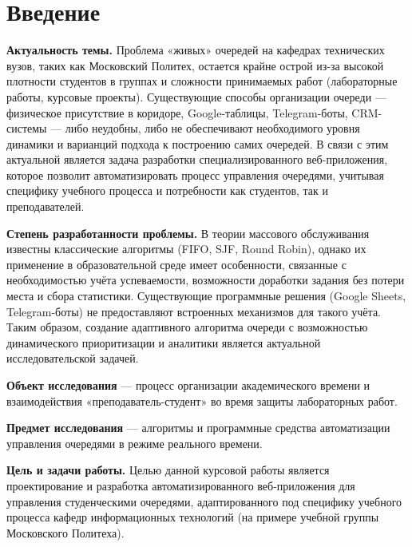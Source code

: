 \section*{Введение}

\textbf{Актуальность темы.} Проблема «живых» очередей на кафедрах технических вузов, 
таких как Московский Политех, остается крайне острой из-за высокой плотности студентов в группах
и сложности принимаемых работ (лабораторные работы, курсовые проекты). Существующие 
способы организации очереди — физическое присутствие в коридоре, Google-таблицы, 
Telegram-боты, CRM-системы — либо неудобны, либо не обеспечивают необходимого уровня динамики и варианций 
подхода к построению самих очередей. В связи с этим актуальной является задача разработки специализированного 
веб-приложения, которое позволит автоматизировать процесс управления очередями, учитывая 
специфику учебного процесса и потребности как студентов, так и преподавателей.

\textbf{Степень разработанности проблемы.} В теории массового обслуживания известны классические 
алгоритмы (FIFO, SJF, Round Robin), однако их применение в образовательной среде имеет особенности, 
связанные с необходимостью учёта успеваемости, возможности доработки задания без потери места 
и сбора статистики. Существующие программные решения (Google Sheets, Telegram-боты) не предоставляют 
встроенных механизмов для такого учёта. Таким образом, создание адаптивного алгоритма очереди с возможностью
 динамического приоритизации и аналитики является актуальной исследовательской задачей.

\textbf{Объект исследования} — процесс организации академического времени и взаимодействия
 «преподаватель-студент» во время защиты лабораторных работ.

\textbf{Предмет исследования} — алгоритмы и программные средства автоматизации управления очередями в режиме реального времени.

\textbf{Цель и задачи работы.} Целью данной курсовой работы является проектирование и 
разработка автоматизированного веб-приложения для управления студенческими очередями, 
адаптированного под специфику учебного процесса кафедр информационных технологий (на примере учебной 
группы Московского Политеха).

